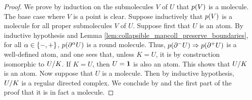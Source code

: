 \begin{proof}
    We prove by induction on the submolecules \( V \) of \( U \) that \( \mapcoll(V) \) is a molecule.
    The base case where \( V \) is a point is clear.
    Suppose inductively that \( \mapcoll(V) \) is a molecule for all proper submolecules \( V \) of \( U \).
    Suppose first that \( U \) is an atom.
    By inductive hypothesis and Lemma \ref{lem:collapsible_mapcoll_preserve_boundaries}, for all \( \a \in \set{-, +} \), \( p(\bd{}{\a} U) \) is a round molecule.
    Thus, \( p(\bd{}{-} U) \celto p(\bd{}{+} U) \) is a well-defined atom, and one sees that, unless \( K = U \), it is by construction isomorphic to \( \coll{K}{U} \).
    If \( K = U \), then \( U = \pt \) is also an atom. 
    This shows that \( \coll{K}{U} \) is an atom.
    Now suppose that \( U \) is a molecule.
    Then by inductive hypothesis, \( \coll{K}{U} \) is a regular directed complex.
    We conclude by \cite[Proposition 6.2.33]{hadzihasanovic2024combinatorics} and the first part of the proof that it is in fact a molecule.
\end{proof}

